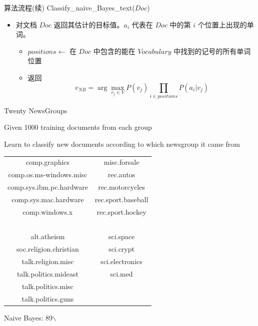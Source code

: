 \documentclass[presentation]{beamer}
\begin{document}
\begin{frame}[label={sec:orgede1d4a}]{算法流程(续)}
Classify\_naive\_Bayes\_text(\(Doc\))
\begin{itemize}
\item 对文档 \(Doc\) 返回其估计的目标值。\(a_i\) 代表在 \(Doc\) 中的第 \(i\) 个位置上出现的单词。
\begin{itemize}
\item \(positions \leftarrow\) 在 \(Doc\) 中包含的能在 \(Vocabulary\) 中找到的记号的所有单词位置
\item 返回
$$v_{NB} = \arg\max_{v_{j} \in V} P(v_{j}) \prod_{i \in positions}P(a_{i}|v_{j})$$
\end{itemize}
\end{itemize}
\end{frame}

\begin{frame}[label={sec:orgba62da6}]{Twenty NewsGroups}
\small

Given 1000 training documents from each group

Learn to classify new documents according to which newsgroup it came from

\bigskip
\begin{center}
\begin{tabular}{cc}
comp.graphics & misc.forsale\\
comp.os.ms-windows.misc & rec.autos \\
comp.sys.ibm.pc.hardware & rec.motorcycles \\
comp.sys.mac.hardware & rec.sport.baseball \\
comp.windows.x & rec.sport.hockey \\
\ & \ \\
alt.atheism & sci.space \\
soc.religion.christian  & sci.crypt\\
talk.religion.misc & sci.electronics\\
talk.politics.mideast & sci.med \\
talk.politics.misc & \ \\
talk.politics.guns & \ \\
\end{tabular}
\end{center}


Naive Bayes: 89$\backslash$%
\end{frame}
\end{document}
